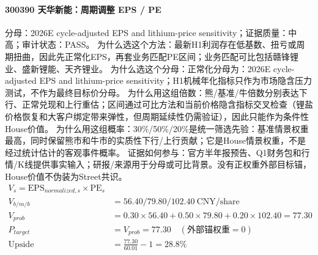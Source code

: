 \paragraph{300390 天华新能：周期调整 EPS / PE}
分母：2026E cycle-adjusted EPS and lithium-price sensitivity；证据质量：中高；审计状态：PASS。
为什么选这个方法：最新H1利润存在低基数、扭亏或周期扭曲，因此先正常化EPS，再套业务匹配PE区间；业务匹配可比包括赣锋锂业、盛新锂能、天齐锂业。
为什么选这个分母：正常化分母为：2026E cycle-adjusted EPS and lithium-price sensitivity；H1机械年化指标只作为市场隐含压力测试，不作为最终目标价分母。
为什么用这组倍数：熊/基准/牛倍数分别表达下行、正常兑现和上行重估；区间通过可比方法和当前价格隐含指标交叉检查（锂盐价格恢复和大客户绑定带来弹性，但周期延续性仍需验证），因此只能作为条件性House价值。
为什么用这组概率：30\%/50\%/20\%是统一筛选先验：基准情景权重最高，同时保留熊市和牛市的实质性下行/上行贡献；它是House情景权重，不是经过统计估计的客观事件概率。
证据如何参与：官方半年报预告、Q1财务包和行情/K线提供事实输入；研报/来源用于分母或可比背景。没有正权重外部目标锚，House价值不伪装为Street共识。
\begin{align*}
V_s=\mathrm{EPS}_{normalized,s}\times \mathrm{PE}_s\\
V_{b/m/b} &= 56.40/79.80/102.40\ \mathrm{CNY/share}\\
V_{prob} &= 0.30\times 56.40+0.50\times 79.80+0.20\times 102.40=77.30\\
P_{target} &= V_{prob}=77.30\quad(\text{外部锚权重}=0)\\
\mathrm{Upside} &= \frac{77.30}{60.01}-1=28.8\%\\
\end{align*}

